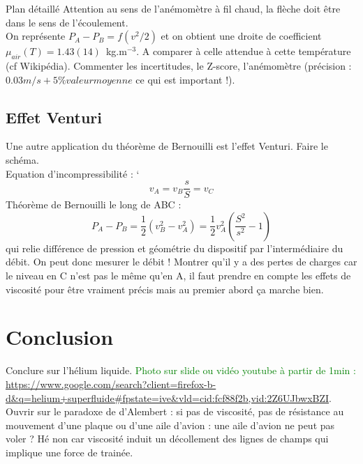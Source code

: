 \begin{reportBlock}{Plan détaillé}
Attention au sens de l'anémomètre à fil chaud, la flèche doit être dans le sens de l'écoulement.\\

On représente $P_A-P_B = f(v^2/2)$ et on obtient une droite de coefficient $\mu_{air}(T)=1.43(14)$~kg.m$^{-3}$. A comparer à celle attendue à cette température (cf Wikipédia). Commenter les incertitudes, le Z-score, l'anémomètre (précision : $0.03m/s + 5\% valeur moyenne$ ce qui est important !).

\subsection{Effet Venturi}
Une autre application du théorème de Bernouilli est l'effet Venturi. Faire le schéma.\\

Equation d'incompressibilité :
`\begin{equation}
    v_A = v_B\frac{s}{S} = v_C
\end{equation}
Théorème de Bernouilli le long de ABC :
\begin{equation}
    P_A - P_B = \frac{1}{2}\left(v_B^2-v_A^2\right) = \frac{1}{2}v_A^2\left(\frac{S^2}{s^2}-1\right)
\end{equation}
qui relie différence de pression et géométrie du dispositif par l'intermédiaire du débit. On peut donc mesurer le débit !
Montrer qu'il y a des pertes de charges car le niveau en C n'est pas le même qu'en A, il faut prendre en compte les effets de viscosité pour être vraiment précis mais au premier abord ça marche bien.


\section*{Conclusion}
Conclure sur l'hélium liquide. \textcolor{green}{Photo sur slide ou vidéo youtube à partir de 1min :} \url{https://www.google.com/search?client=firefox-b-d&q=helium+superfluide#fpstate=ive&vld=cid:fcf88f2b,vid:2Z6UJbwxBZI}.\\

Ouvrir sur le paradoxe de d'Alembert : si pas de viscosité, pas de résistance au mouvement d'une plaque ou d'une aile d'avion : une aile d'avion ne peut pas voler ? Hé non car viscosité induit un décollement des lignes de champs qui implique une force de trainée.

\end{reportBlock}
